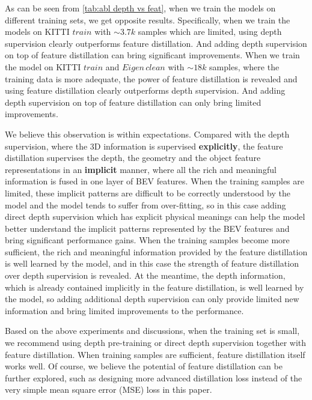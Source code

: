 \documentclass[runningheads]{llncs}
\begin{document}
As can be seen from \cref{tab:abl depth vs feat}, when we train the models on different training sets, we get opposite results.
Specifically, when we train the models on KITTI $train$ with $\sim 3.7k$ samples which are limited, using depth supervision clearly outperforms feature distillation. And adding depth supervision on top of feature distillation can bring significant improvements.
When we train the model on KITTI $train$ and $Eigen\,clean$ with $\sim 18k$ samples, where the training data is more 
adequate, the power of feature distillation is revealed and using feature distillation clearly outperforms depth supervision.
And adding depth supervision on top of feature distillation can only bring limited improvements.

We believe this observation is within expectations.
Compared with the depth supervision, where the 3D information is supervised \textbf{explicitly}, the feature distillation supervises the depth, the geometry and the object feature representations in an \textbf{implicit} manner, where all the rich and meaningful information is fused in one layer of BEV features.
When the training samples are limited, these implicit patterns are difficult to be correctly understood by the model and the model tends to suffer from over-fitting, so in this case adding direct depth supervision which has explicit physical meanings can help the model better understand the implicit patterns represented by the BEV features and bring significant performance gains.
When the training samples become more sufficient, the rich and meaningful information provided by the feature distillation is well learned by the model, and in this case the strength of feature distillation over depth supervision is revealed.
At the meantime, the depth information, which is already contained implicitly in the feature distillation, is well learned by the model, so adding additional depth supervision can only provide limited new information and bring limited improvements to the performance.



Based on the above experiments and discussions, when the training set is small, we recommend using depth pre-training or direct depth supervision together with feature distillation.
When training samples are sufficient, feature distillation itself works well. 
Of course, we believe the potential of feature distillation can be further explored, such as designing more advanced distillation loss instead of the very simple mean square error (MSE) loss in this paper.
\end{document}

